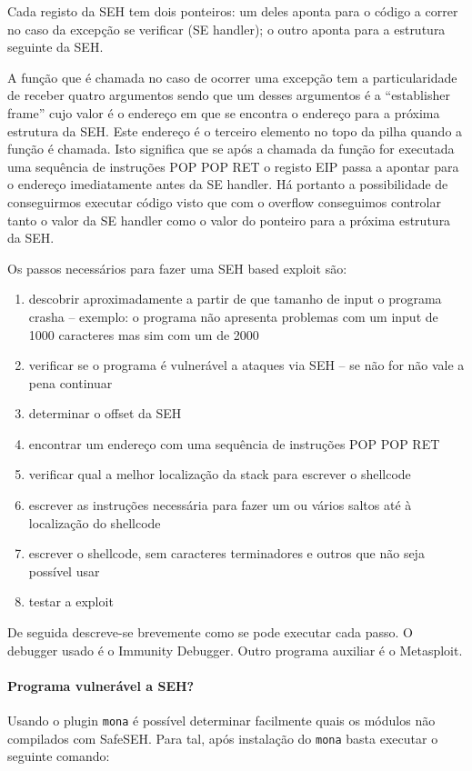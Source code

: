 \documentclass[a4paper]{article}
\begin{document}
Cada registo da SEH tem dois ponteiros: um deles aponta para o código a correr no caso da excepção se verificar (SE handler); o outro aponta para a estrutura seguinte da SEH.

A função que é chamada no caso de ocorrer uma excepção tem a particularidade de receber quatro argumentos sendo que um desses argumentos é a ``establisher frame'' cujo valor é o endereço em que se encontra o endereço para a próxima estrutura da SEH. Este endereço é o terceiro elemento no topo da pilha quando a função é chamada. Isto significa que se após a chamada da função for executada uma sequência de instruções POP POP RET o registo EIP passa a apontar para o endereço imediatamente antes da SE handler. Há portanto a possibilidade de conseguirmos executar código visto que com o overflow conseguimos controlar tanto o valor da SE handler como o valor do ponteiro para a próxima estrutura da SEH.

Os passos necessários para fazer uma SEH based exploit são:

\begin{enumerate}
	\item descobrir aproximadamente a partir de que tamanho de input o programa crasha -- exemplo: o programa não apresenta problemas com um input de 1000 caracteres mas sim com um de 2000 
	\item verificar se o programa é vulnerável a ataques via SEH -- se não for não vale a pena continuar
	\item determinar o offset da SEH
	\item encontrar um endereço com uma sequência de instruções POP POP RET
	\item verificar qual a melhor localização da stack para escrever o shellcode
	\item escrever as instruções necessária para fazer um ou vários saltos até à localização do shellcode
	\item escrever o shellcode, sem caracteres terminadores e outros que não seja possível usar
	\item testar a exploit
\end{enumerate}

De seguida descreve-se brevemente como se pode executar cada passo. O debugger usado é o Immunity Debugger. Outro programa auxiliar é o Metasploit.

\paragraph*{Programa vulnerável a SEH?} Usando o plugin \texttt{mona} é possível determinar facilmente quais os módulos não compilados com SafeSEH. Para tal, após instalação do \texttt{mona} basta executar o seguinte comando:
\end{document}
